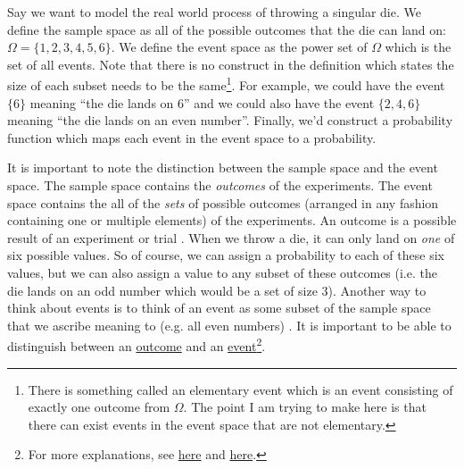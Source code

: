 \begin{eg}
Say we want to model the real world process of throwing a singular die. We define the sample space as all of the possible outcomes that the die can land on: $\Omega = \{1,2,3,4,5,6\}$. We define the event space as the power set of $\Omega$ which is the set of all events. Note that there is no construct in the definition which states the size of each subset needs to be the same\footnote{There is something called an elementary event which is an event consisting of exactly one outcome from $\Omega$. The point I am trying to make here is that there can exist events in the event space that are not elementary.}. For example, we could have the event $\{6\}$ meaning “the die lands on $6$” and we could also have the event $\{2,4,6\}$ meaning “the die lands on an even number”. Finally, we'd construct a probability function which maps each event in the event space to a probability. 

\end{eg}

It is important to note the distinction between the sample space and the event space. The sample space contains the \textit{outcomes} of the experiments. The event space contains the all of the \textit{sets} of possible outcomes (arranged in any fashion containing one or multiple elements) of the experiments. An outcome is a possible result of an experiment or trial \cite{enwiki:probabilityspace}. When we throw a die, it can only land on \textit{one} of six possible values. So of course, we can assign a probability to each of these six values, but we can also assign a value to any subset of these outcomes (i.e. the die lands on an odd number which would be a set of size $3$). Another way to think about events is to think of an event as some subset of the sample space that we ascribe meaning to (e.g. all even numbers) \cite{cs109reader}. It is important to be able to distinguish between an \href{https://en.wikipedia.org/wiki/Outcome_(probability)}{outcome} and an \href{https://en.wikipedia.org/wiki/Event_(probability_theory)}{event}\footnote{For more explanations, see \href{https://www.statology.org/outcome-vs-event/}{here} and \href{https://stats.stackexchange.com/questions/143459/are-the-terms-event-and-outcome-synonymous}{here}.}.   

